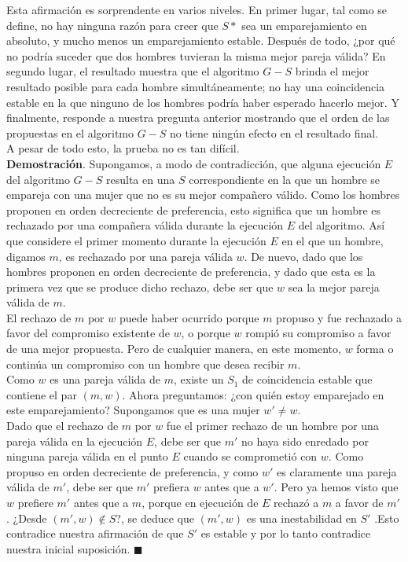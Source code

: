 \documentclass[a4paper]{article}
\begin{document}
Esta afirmación es sorprendente en varios niveles. En primer lugar, tal como se define, no hay ninguna razón para creer que $S*$ sea un emparejamiento en absoluto, y mucho menos un emparejamiento estable. Después de todo, ¿por qué no podría suceder que dos hombres tuvieran la misma mejor pareja válida? En segundo lugar, el resultado muestra que el algoritmo $G-S$ brinda el mejor resultado posible para cada hombre simultáneamente; no hay una coincidencia estable en la que ninguno de los hombres podría haber esperado hacerlo mejor. Y finalmente, responde a nuestra pregunta anterior mostrando que el orden de las propuestas en el algoritmo $G-S$ no tiene ningún efecto en el resultado final.\\

A pesar de todo esto, la prueba no es tan difícil.\\

\textbf{Demostración}. Supongamos, a modo de contradicción, que alguna ejecución $E$ del algoritmo $G-S$ resulta en una $S$ correspondiente en la que un hombre se empareja con una mujer que no es su mejor compañero válido. Como los hombres proponen en orden decreciente de preferencia, esto significa que un hombre es rechazado por una compañera válida durante la ejecución $E$ del algoritmo. Así que considere el primer momento durante la ejecución $E$ en el que un hombre, digamos $m$, es rechazado por una pareja válida $w$. De nuevo, dado que los hombres proponen en orden decreciente de preferencia, y dado que esta es la primera vez que se produce dicho rechazo, debe ser que $w$ sea la mejor pareja válida de $m$.\\

El rechazo de $m$ por $w$ puede haber ocurrido porque $m$ propuso y fue rechazado a favor del compromiso existente de $w$, o porque $w$ rompió su compromiso a favor de una mejor propuesta. Pero de cualquier manera, en este momento, $w$ forma o continúa un compromiso con un hombre que desea recibir $m$.\\

Como $w$ es una pareja válida de $m$, existe un $S_1$ de coincidencia estable que contiene el par $(m, w)$. Ahora preguntamos: ¿con quién estoy emparejado en este emparejamiento? Supongamos que es una mujer $w'≠ w$.\\

Dado que el rechazo de $m$ por $w$ fue el primer rechazo de un hombre por una pareja válida en la ejecución $E$, debe ser que $m'$ no haya sido enredado por ninguna pareja válida en el punto $E$ cuando se comprometió con $w$. Como propuso en orden decreciente de preferencia, y como $w'$ es claramente una pareja válida de $m'$, debe ser que $m'$ prefiera $w$ antes que a $w'$. Pero ya hemos visto que $w$ prefiere $m'$ antes que a $m$, porque en ejecución de $E$ rechazó a $m$ a favor de $m'$. ¿Desde $ (m',w) ∉ S$?, se deduce que $(m', w)$ es una inestabilidad en $S'$ .Esto contradice nuestra afirmación de que $S'$ es estable y por lo tanto contradice nuestra inicial suposición.
$ \blacksquare $\\
\end{document}
